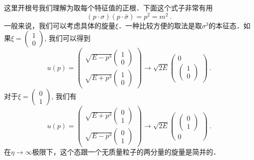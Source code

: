 这里开根号我们理解为取每个特征值的正根．下面这个式子非常有用
\begin{equation}
(p\cdot\sigma)(p\cdot \bar\sigma) = p^2 = m^2~.
\end{equation}
一般来说，我们可以考虑具体的旋量$\xi$．一种比较方便的取法是取$\sigma^3$的本征态．如果$\xi=\begin{pmatrix}
1 \\ 0
\end{pmatrix}$, 我们可以得到
\begin{equation}\label{diracs_eq2}
u(p) = \begin{pmatrix}
\sqrt{E-p^3}\begin{pmatrix}
1 \\ 0 
\end{pmatrix} \\
\sqrt{E+p^3}\begin{pmatrix}
1 \\ 0
\end{pmatrix}
\end{pmatrix} \rightarrow \sqrt{2E}\begin{pmatrix}
0  \\ 
\begin{pmatrix}
1 \\ 0
\end{pmatrix}
\end{pmatrix}~.
\end{equation}
对于$\xi = \begin{pmatrix}
0 \\ 1
\end{pmatrix}$, 
我们有
\begin{equation}\label{diracs_eq3}
u(p) = \begin{pmatrix}
\sqrt{E+p^3}\begin{pmatrix}
0 \\ 1 
\end{pmatrix} \\
\sqrt{E-p^3}\begin{pmatrix}
0 \\ 1
\end{pmatrix}
\end{pmatrix} \rightarrow \sqrt{2E}\begin{pmatrix}
\begin{pmatrix}
0 \\ 1
\end{pmatrix}  \\ 
0
\end{pmatrix}~.
\end{equation}
在$\eta\rightarrow \infty$极限下，这个态跟一个无质量粒子的两分量的旋量是简并的．

